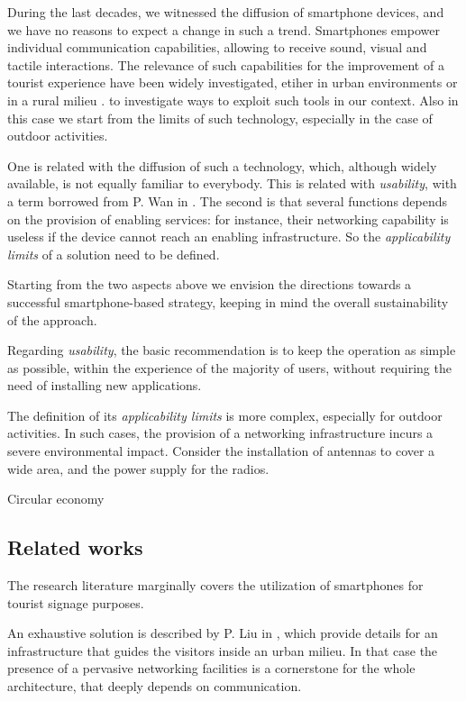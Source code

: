 \documentclass[sustainability,article,submit,pdftex,moreauthors]{Definitions/mdpi}
\begin{document}
During the last decades, we witnessed the diffusion of smartphone devices, and we have no reasons to expect a change in such a trend. Smartphones empower individual communication capabilities, allowing to receive sound, visual and tactile interactions. The relevance of such capabilities for the improvement of a tourist experience have been widely investigated, etiher in urban environments \cite{liu16a} or in a rural milieu \cite{kum20a}. to investigate ways to exploit such tools in our context. Also in this case we start from the limits of such technology, especially in the case of outdoor activities.

One is related with the diffusion of such a technology, which, although widely available, is not equally familiar to everybody. This is related with {\em usability}, with a term borrowed from P. Wan in \cite{wan22a}. The second is that several functions depends on the provision of enabling services: for instance, their networking capability is useless if the device cannot reach an enabling infrastructure. So the {\em applicability limits} of a solution need to be defined.

Starting from the two aspects above we envision the directions towards a successful smartphone-based strategy, keeping in mind the overall sustainability of the approach.

Regarding {\em usability}, the basic recommendation is to keep the operation as simple as possible, within the experience of the majority of users, without requiring the need of installing new applications.

The definition of its {\em applicability limits} is more complex, especially for outdoor activities. In such cases, the provision of a networking infrastructure incurs a severe environmental impact. Consider the installation of antennas to cover a wide area, and the power supply for the radios. 

Circular economy

\subsection{Related works}

The research literature marginally covers the utilization of smartphones for tourist signage purposes.

An exhaustive solution is described by P. Liu in \cite{liu16a}, which provide details for an infrastructure that guides the visitors inside an urban milieu. In that case the presence of a pervasive networking facilities is a cornerstone for the whole architecture, that deeply depends on communication. 
\end{document}
